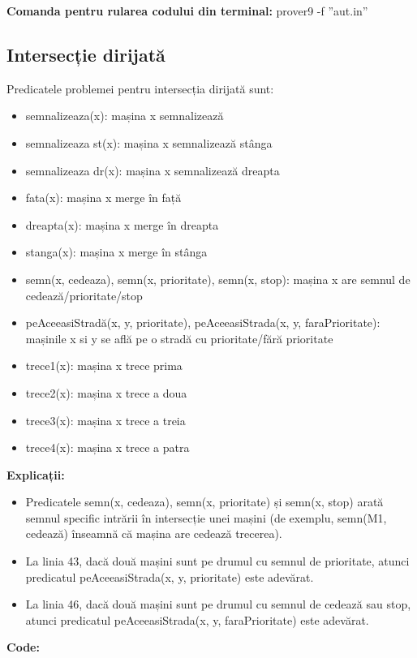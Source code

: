 \textbf{Comanda pentru rularea codului din terminal:}
prover9 -f ”aut.in”

\newpage
\subsection{Intersecție dirijată}

Predicatele problemei pentru intersecția dirijată sunt:

\newline
 \begin{itemize}
    \setlength\itemsep{0em}
    \item  semnalizeaza(x): mașina x semnalizează
    \item semnalizeaza st(x): mașina x semnalizează stânga
    \item semnalizeaza  dr(x): mașina x semnalizează dreapta
    \item fata(x): mașina x merge în față

\item  dreapta(x): mașina x merge în dreapta
    \item stanga(x): mașina x merge în stânga
    \item semn(x, cedeaza), semn(x, prioritate), semn(x, stop): mașina x are semnul de cedează/prioritate/stop
    \item peAceeasiStradă(x, y, prioritate), peAceeasiStrada(x, y, faraPrioritate): mașinile x si y se află pe o stradă cu prioritate/fără prioritate
    \item trece1(x): mașina x trece prima
    \item trece2(x): mașina x trece a doua
    \item trece3(x): mașina x trece a treia
    \item trece4(x): mașina x trece a patra
\end{itemize}

\textbf{ Explicații:}
\newline
 \begin{itemize}
    \setlength\itemsep{0em}
	\item Predicatele semn(x, cedeaza), semn(x, prioritate) și semn(x, stop) arată semnul specific intrării în intersecție unei mașini (de exemplu, semn(M1, cedează) înseamnă că mașina are cedează trecerea).
\item La linia 43, dacă două mașini sunt pe drumul cu semnul de prioritate, atunci predicatul peAceeasiStrada(x, y, prioritate) este adevărat.
\item	La linia 46, dacă două mașini sunt pe drumul cu semnul  de cedează sau stop, atunci predicatul peAceeasiStrada(x, y, faraPrioritate) este adevărat.
\end{itemize}
\textbf{Code:}

